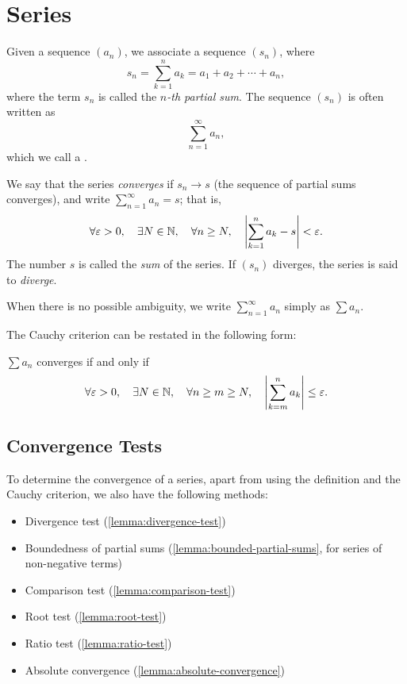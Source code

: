 \section{Series}
\begin{definition}[Series]
Given a sequence $(a_n)$, we associate a sequence $(s_n)$, where
\[s_n=\sum_{k=1}^n a_k=a_1+a_2+\cdots+a_n,\]
where the term $s_n$ is called the \emph{$n$-th partial sum}. The sequence $(s_n)$ is often written as
\[\sum_{n=1}^{\infty}a_n,\]
which we call a .
\end{definition}

\begin{definition}
We say that the series \emph{converges} if $s_n\to s$ (the sequence of partial sums converges), and write $\displaystyle\sum_{n=1}^\infty a_n=s$; that is,
\[\forall\varepsilon>0,\quad\exists N\in\mathbb N,\quad\forall n\ge N,\quad\left|\sum_{k=1}^n a_k-s\right|<\varepsilon.\]
The number $s$ is called the \emph{sum} of the series. If $(s_n)$ diverges, the series is said to \emph{diverge}.
\end{definition}

\begin{notation}
When there is no possible ambiguity, we write $\displaystyle\sum_{n=1}^{\infty}a_n$ simply as $\sum a_n$.
\end{notation}

The Cauchy criterion can be restated in the following form:

\begin{lemma}
$\sum a_n$ converges if and only if
\[\forall\varepsilon>0,\quad\exists N\in\mathbb N,\quad\forall n\ge m\ge N,\quad\left|\sum_{k=m}^n a_k\right|\le\varepsilon.\]
\end{lemma}
\pagebreak

\subsection{Convergence Tests}
To determine the convergence of a series, apart from using the definition and the Cauchy criterion, we also have the following methods:
\begin{itemize}
\item Divergence test (\ref{lemma:divergence-test})
\item Boundedness of partial sums (\ref{lemma:bounded-partial-sums}, for series of non-negative terms)
\item Comparison test (\ref{lemma:comparison-test})
\item Root test (\ref{lemma:root-test})
\item Ratio test (\ref{lemma:ratio-test})
\item Absolute convergence (\ref{lemma:absolute-convergence})
\end{itemize}


